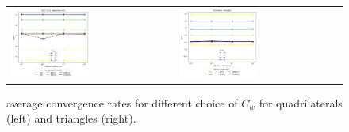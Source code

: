 \begin{figure}[h!]
	\centering
	\begin{tabular}{p{} p{}}
		\vspace{0pt} 
		
\includegraphics[width=0.49\textwidth]{../figs/parametric/diffusion_2D/ord_laplace_2_4}
		&
		\vspace{0pt} 
		
\includegraphics[width=0.49\textwidth]{../figs/parametric/diffusion_2D/ord_laplace_2_3}
	\end{tabular}
	\caption{ average convergence rates for different choice of $C_w$ 
	for quadrilaterals (left) and triangles (right).}
	\label{fig:orders_lapalce}
\end{figure}

%		
%		

